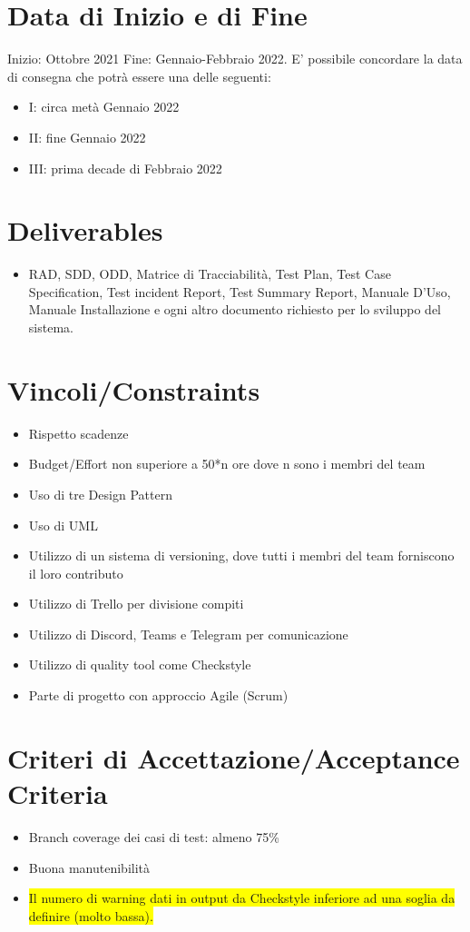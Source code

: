 \documentclass[12pt]{article}
\begin{document}
  \section{Data di Inizio e di Fine}
  Inizio: Ottobre 2021
  Fine: Gennaio-Febbraio 2022. E’ possibile concordare la data di consegna che potrà essere una delle seguenti:
  
  \begin{itemize}
      \item I: circa metà Gennaio 2022
      \item II: fine Gennaio 2022
      \item III: prima decade di Febbraio 2022
  \end{itemize}
  
  \section{Deliverables}
  \begin{itemize}
      \item RAD, SDD, ODD, Matrice di Tracciabilità, Test Plan, Test Case Specification, Test incident Report, Test Summary Report, Manuale D’Uso, Manuale Installazione e ogni altro documento richiesto per lo sviluppo del sistema.
  \end{itemize}
  
  \section{Vincoli/Constraints}
  \begin{itemize}
  \item Rispetto scadenze
  \item Budget/Effort non superiore a 50*n ore dove n sono i membri del team 
  \item Uso di tre Design Pattern
  \item Uso di UML
  \item Utilizzo di un sistema di versioning, dove tutti i membri del team forniscono il loro contributo
  \item Utilizzo di Trello per divisione compiti
  \item Utilizzo di Discord, Teams e Telegram per comunicazione
  \item Utilizzo di quality tool come Checkstyle
  \item Parte di progetto con approccio Agile (Scrum)
  \end{itemize}
  
  \section{Criteri di Accettazione/Acceptance Criteria}
  \begin{itemize}
      \item Branch coverage dei casi di test: almeno 75\%
      \item Buona manutenibilità
      \item \colorbox{yellow}{Il numero di warning dati in output da Checkstyle inferiore ad una soglia da definire (molto bassa).}
  \end{itemize}
  
\end{document}

